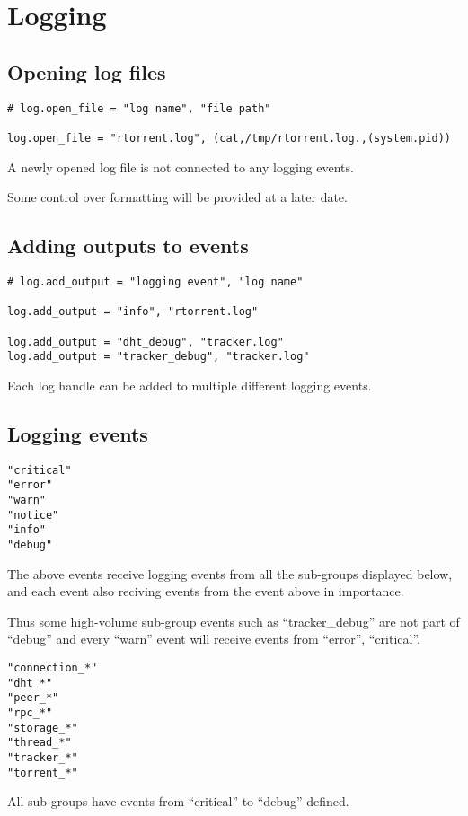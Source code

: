 \section{Logging}

\subsection{Opening log files}

\begin{verbatim}
# log.open_file = "log name", "file path"

log.open_file = "rtorrent.log", (cat,/tmp/rtorrent.log.,(system.pid))  
\end{verbatim}

A newly opened log file is not connected to any logging events.

Some control over formatting will be provided at a later date.


\subsection{Adding outputs to events}

\begin{verbatim}
# log.add_output = "logging event", "log name"

log.add_output = "info", "rtorrent.log"

log.add_output = "dht_debug", "tracker.log"
log.add_output = "tracker_debug", "tracker.log"
\end{verbatim}

Each log handle can be added to multiple different logging events.


\subsection{Logging events}

\begin{verbatim}
"critical"
"error"
"warn"
"notice"
"info"
"debug"
\end{verbatim}

The above events receive logging events from all the sub-groups
displayed below, and each event also reciving events from the event
above in importance.

Thus some high-volume sub-group events such as ``tracker\_debug'' are
not part of ``debug'' and every ``warn'' event will receive events
from ``error'', ``critical''.

\begin{verbatim}
"connection_*"
"dht_*"
"peer_*"
"rpc_*"
"storage_*"
"thread_*"
"tracker_*"
"torrent_*"
\end{verbatim}

All sub-groups have events from ``critical'' to ``debug'' defined.

